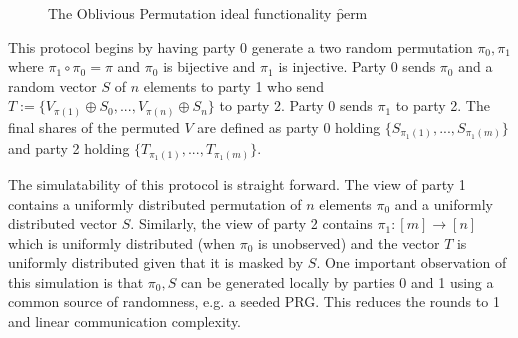 \begin{figure}[ht]
	\caption{The Oblivious Permutation ideal functionality \f{perm}}
	\label{fig:perm-ideal}	
\end{figure}

This protocol begins by having party 0 generate a two random permutation $\pi_0,\pi_1$ where $\pi_1 \circ \pi_0 = \pi$ and $\pi_0$ is bijective and $\pi_1$ is injective. Party 0 sends $\pi_0$ and a random vector $S$ of $n$ elements to party 1 who send $T := \{V_{\pi(1)} \oplus S_0, ...,V_{\pi(n)} \oplus S_n \}$ to party 2. Party 0 sends $\pi_1$ to party 2. The final shares of the permuted $V$ are defined as party 0 holding $\{S_{\pi_1(1)}, ..., S_{\pi_1(m)}\}$ and party 2 holding $\{T_{\pi_1(1)}, ..., T_{\pi_1(m)}\}$.

The simulatability of this protocol is straight forward. The view of party 1 contains a uniformly distributed permutation of $n$ elements $\pi_0$ and a uniformly distributed vector $S$. Similarly, the view of party 2 contains $\pi_1: [m]\rightarrow [n]$ which is uniformly distributed (when $\pi_0$ is unobserved) and the vector $T$ is uniformly distributed given that it is masked by $S$. One important observation of this simulation is that $\pi_0,S$ can be generated locally by parties 0 and 1 using a common source of randomness, e.g. a seeded PRG. This reduces the rounds to 1 and linear communication complexity. 

